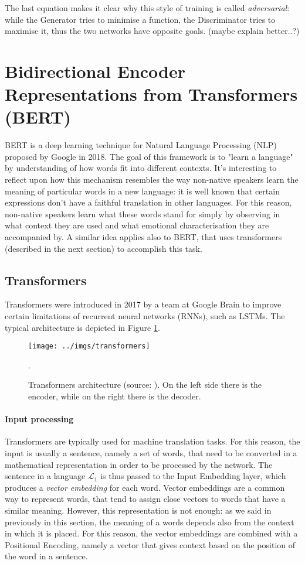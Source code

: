 \documentclass[12pt,a4paper]{book}
\theoremstyle{definition}
\begin{document}
	The last equation makes it clear why this style of training is called \textit{adversarial}: while the Generator tries to minimise a function, the Discriminator tries to maximise it, thus the two networks have opposite goals. (maybe explain better..?)
	
	\section{Bidirectional Encoder Representations from Transformers (BERT)}
	BERT \cite{Devlin2018} is a deep learning technique for Natural Language Processing (NLP) proposed by Google in 2018. The goal of this framework is to "learn a language" by understanding of how words fit into different contexts. It's interesting to reflect upon how this mechanism resembles the way non-native speakers learn the meaning of particular words in a new language: it is well known that certain expressions don't have a faithful translation in other languages. For this reason, non-native speakers learn what these words stand for simply by observing in what context they are used and what emotional characterisation they are accompanied by. A similar idea applies also to BERT, that uses transformers (described in the next section) to accomplish this task.
	
	\subsection{Transformers}
	Transformers \cite{Vaswani2017} were introduced in 2017 by a team at Google Brain to improve certain limitations of recurrent neural networks (RNNs), such as LSTMs. The typical architecture is depicted in Figure \ref{fig:transformer}.
	\begin{figure}[!ht]
		\centering
		\texttt{[image: ../imgs/transformers]}
		\captionsetup{width=.7\linewidth}
		\caption{Transformers architecture (source: \cite{Vaswani2017}). On the left side there is the encoder, while on the right there is the decoder.}
		\label{fig:transformer}.
	\end{figure}
	
	\paragraph{Input processing}
	Transformers are typically used for machine translation tasks. For this reason, the input is usually a sentence, namely a set of words, that need to be converted in a mathematical representation in order to be processed by the network. The sentence in a language $\mathcal{L}_1$ is thus passed to the Input Embedding layer, which produces a \textit{vector embedding} for each word. Vector embeddings are a common way to represent words, that tend to assign close vectors to words that have a similar meaning. However, this representation is not enough: as we said in previously in this section, the meaning of a words depends also from the context in which it is placed. For this reason, the vector embeddings are combined with a Positional Encoding, namely a vector that gives context based on the position of the word in a sentence. 
	
\end{document}
